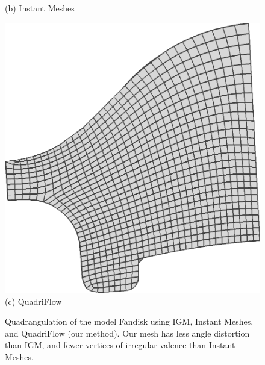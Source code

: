 \begin{figure}
\begin{minipage}{0.32\linewidth}
(b) Instant Meshes\\
\end{minipage}
\begin{minipage}{0.32\linewidth}
\centering
\includegraphics[width=\linewidth]{quadriflow/result/angle03.png}\\
(c) QuadriFlow
\end{minipage}

\caption{Quadrangulation of the model Fandisk using IGM, Instant Meshes, and QuadriFlow (our method). Our mesh has less angle distortion than IGM, and fewer vertices of irregular valence than Instant Meshes.}
\label{fig:quad-angle-distortion}
\end{figure}
